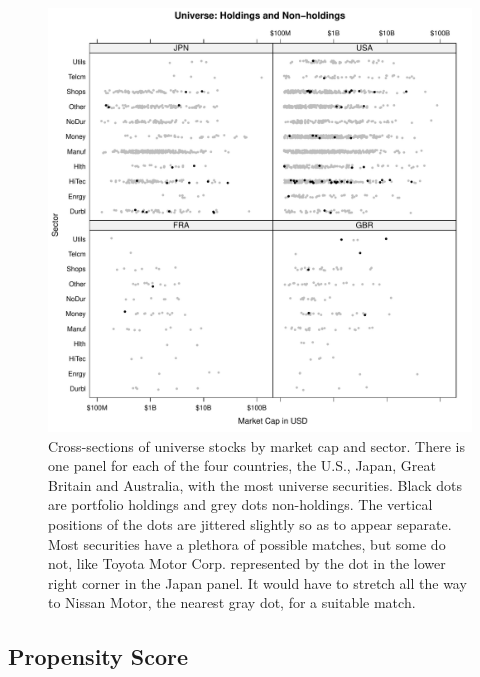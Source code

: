 \documentclass{article}\usepackage{graphicx, color}
\makeatletter
\def\maxwidth{ %
  \ifdim\Gin@nat@width>\linewidth
    \linewidth
  \else
    \Gin@nat@width
  \fi
}
\newenvironment{knitrout}{}{} %
\makeatother
\begin{document}
\begin{figure}
\begin{center}
\begin{knitrout}
\color{fgcolor}
\includegraphics[width=\maxwidth]{figure/unnamed-chunk-8} 

\end{knitrout}

\end{center}
\caption{Cross-sections of universe stocks by market cap and
  sector. There is one panel for each of the four countries, the U.S.,
  Japan, Great Britain and Australia, with the most universe
  securities. Black dots
  are portfolio holdings and grey dots non-holdings. The vertical
  positions of the dots are jittered slightly so as to appear
  separate. Most securities have a plethora of possible matches,
  but some do not, like Toyota Motor Corp. represented by the dot in the
  lower right corner in the Japan panel. It would have to stretch all
  the way to Nissan Motor, the nearest gray dot, for a suitable match.}
\label{FigurePortfolioUniverse}
\end{figure}

\subsection{Propensity Score}
\end{document}

